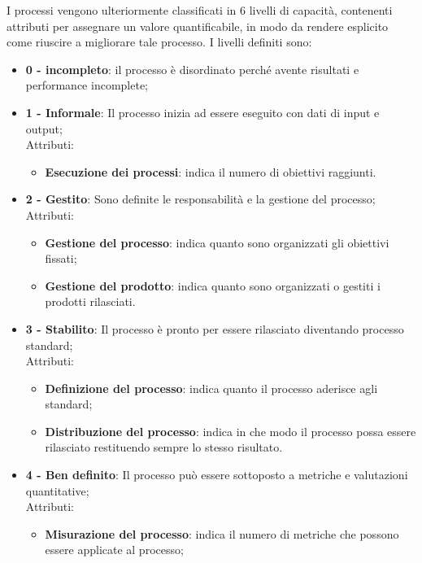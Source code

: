 \documentclass[../piano-di-qualifica.tex]{subfiles}
\begin{document}
I processi vengono ulteriormente classificati in 6 livelli di capacità, contenenti attributi per assegnare un valore quantificabile, in modo da rendere esplicito come riuscire a migliorare tale processo.
I livelli definiti sono:
\begin{itemize}
    \item \textbf{0 - incompleto}: il processo è disordinato perché avente risultati e performance incomplete;
    \item \textbf{1 - Informale}: Il processo inizia ad essere eseguito con dati di input e output;
       \\ Attributi:
        \begin{itemize}
            \item \textbf{Esecuzione dei processi}: indica il numero di obiettivi raggiunti.
        \end{itemize}
    \item \textbf{2 - Gestito}: Sono definite le responsabilità e la gestione del processo;
        \\ Attributi:
        \begin{itemize}
            \item \textbf{Gestione del processo}: indica quanto sono organizzati gli obiettivi fissati;
            \item \textbf{Gestione del prodotto}: indica quanto sono organizzati o gestiti i prodotti rilasciati.
        \end{itemize}
    \item \textbf{3 - Stabilito}: Il processo è pronto per essere rilasciato diventando processo standard;
        \\ Attributi:
        \begin{itemize}
            \item \textbf{Definizione del processo}: indica quanto il processo aderisce agli standard;
            \item \textbf{Distribuzione del processo}: indica in che modo il processo possa essere rilasciato restituendo sempre lo stesso risultato.
        \end{itemize}
    \item \textbf{4 - Ben definito}: Il processo può essere sottoposto a metriche e valutazioni quantitative;
        \\ Attributi:
        \begin{itemize}
            \item \textbf{Misurazione del processo}: indica il numero di metriche che possono essere applicate al processo;

\end{itemize}
\end{itemize}
\end{document}
